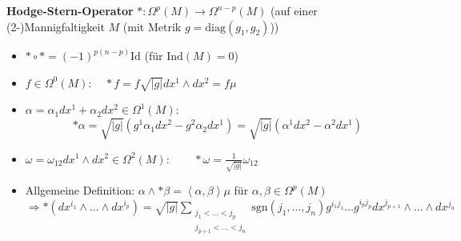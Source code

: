 \documentclass{beamer}
\begin{document}
  \begin{frame}
    \begin{block}{\textbf{Hodge-Stern-Operator} \( *: \Omega^{p}(M) \longrightarrow \Omega^{n-p}(M)\) (auf einer (2-)Mannigfaltigkeit \( M \) (mit Metrik \( g = \text{diag}(g_{1}, g_{2}) \)))}
      \begin{itemize}
        \item<2-> \( * \circ * = (-1)^{p(n-p)}\text{Id} \) \qquad (für \( \text{Ind}(M) = 0 \))
        \item<3-> \( f \in \Omega^{0}(M):\quad * f = f \sqrt{|g|} dx^{1}\wedge dx^{2}  = f\mu\) 
        \item<4-> \( \alpha = \alpha_{1}dx^{1} + \alpha_{2}dx^{2} \in \Omega^{1}(M):\) 
              \[ *\alpha = \sqrt{|g|} \left( g^{1} \alpha_{1}dx^{2} - g^{2} \alpha_{2}dx^{1} \right) = \sqrt{|g|} \left( \alpha^{1}dx^{2} - \alpha^{2}dx^{1} \right)\]
        \item<5-> \( \omega = \omega_{12}dx^{1}\wedge dx^{2} \in \Omega^{2}(M):\qquad *\omega = \frac{1}{\sqrt{|g|}}\omega_{12} \)
        \item<6-> Allgemeine Definition: \( \alpha \wedge *\beta = \left\langle \alpha , \beta \right\rangle \mu\) für \( \alpha, \beta \in \Omega^{p}(M) \)\\
              \( \Rightarrow *\left( dx^{i_{1}} \wedge \ldots \wedge dx^{i_{p}} \right) 
                  = \sqrt{|g|} \sum_{\begin{smallmatrix}
                                          j_{1}<\ldots<j_{p} \\
                                          j_{p+1}<\ldots<j_{n}
                                     \end{smallmatrix}} \text{sgn}\left( j_{1}, \ldots, j_{n} \right) g^{i_{1}j_{1}}\ldots g^{i_{p}j_{p}} dx^{j_{p+1}} \wedge \ldots \wedge dx^{j_{n}}\)
      \end{itemize}
    \end{block}
  \end{frame}
\end{document}
